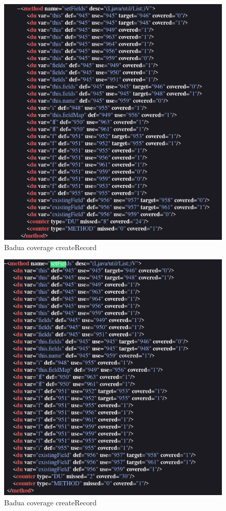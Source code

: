 \documentclass[12pt, a4paper]{article}
\begin{document}
  \begin{figure}
    \includegraphics[width=\linewidth]{./images/create_record/BaduaCoverage1.png}
    \caption{Badua coverage createRecord}
    \label{fig:BaduaCoverageCreateRecord1}
  \end{figure}

  \begin{figure}
    \includegraphics[width=\linewidth]{./images/create_record/BaduaCoverage2.png}
    \caption{Badua coverage createRecord}
    \label{fig:BaduaCoverageCreateRecord2}
  \end{figure}
\end{document}
